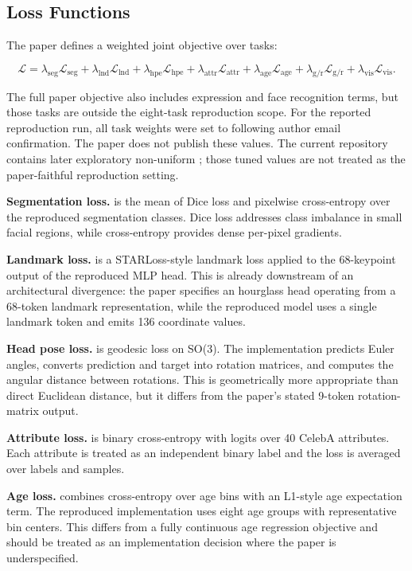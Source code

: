 \documentclass[11pt]{article}
\begin{document}
\subsection{Loss Functions}


The paper defines a weighted joint objective over tasks:


\[
\mathcal{L} =
\lambda_{\text{seg}} \mathcal{L}_{\text{seg}}
+ \lambda_{\text{lnd}} \mathcal{L}_{\text{lnd}}
+ \lambda_{\text{hpe}} \mathcal{L}_{\text{hpe}}
+ \lambda_{\text{attr}} \mathcal{L}_{\text{attr}}
+ \lambda_{\text{age}} \mathcal{L}_{\text{age}}
+ \lambda_{\text{g/r}} \mathcal{L}_{\text{g/r}}
+ \lambda_{\text{vis}} \mathcal{L}_{\text{vis}} .
\]

The full paper objective also includes expression and face recognition terms, but those tasks are outside the eight-task reproduction scope. For the reported reproduction run, all task weights were set to  following author email confirmation. The paper does not publish these values. The current repository contains later exploratory non-uniform ; those tuned values are not treated as the paper-faithful reproduction setting.


\textbf{Segmentation loss.}  is the mean of Dice loss and pixelwise cross-entropy over the reproduced segmentation classes. Dice loss addresses class imbalance in small facial regions, while cross-entropy provides dense per-pixel gradients.


\textbf{Landmark loss.}  is a STARLoss-style landmark loss applied to the 68-keypoint output of the reproduced MLP head. This is already downstream of an architectural divergence: the paper specifies an hourglass head operating from a 68-token landmark representation, while the reproduced model uses a single landmark token and emits 136 coordinate values.


\textbf{Head pose loss.}  is geodesic loss on SO(3). The implementation predicts Euler angles, converts prediction and target into rotation matrices, and computes the angular distance between rotations. This is geometrically more appropriate than direct Euclidean distance, but it differs from the paper's stated 9-token rotation-matrix output.


\textbf{Attribute loss.}  is binary cross-entropy with logits over 40 CelebA attributes. Each attribute is treated as an independent binary label and the loss is averaged over labels and samples.


\textbf{Age loss.}  combines cross-entropy over age bins with an L1-style age expectation term. The reproduced implementation uses eight age groups with representative bin centers. This differs from a fully continuous age regression objective and should be treated as an implementation decision where the paper is underspecified.
\end{document}
